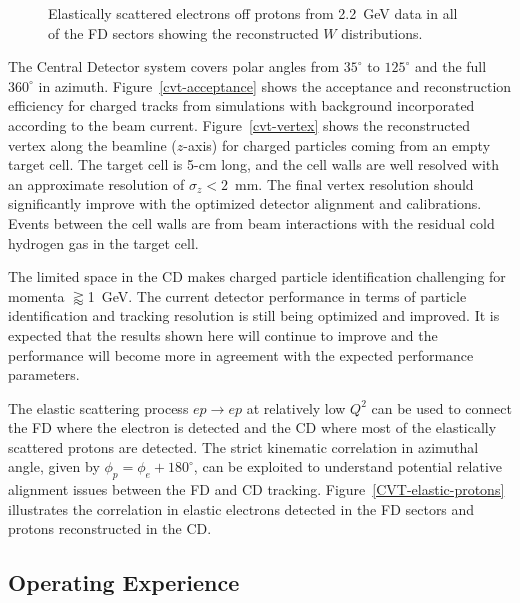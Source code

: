 \documentclass[final,3p,twocolumn]{elsarticle}
\begin{document}
\begin{figure}[t!]
\caption{Elastically scattered electrons off protons from 2.2~GeV data in all of the FD sectors showing the
  reconstructed $W$ distributions.}
\label{elastic-electrons}
\end{figure}

The Central Detector system covers polar angles from $35^\circ$ to $125^\circ$ and the full $360^\circ$ in azimuth.
Figure~\ref{cvt-acceptance} shows the acceptance and reconstruction efficiency for charged tracks from simulations
with background incorporated according to the beam current. Figure~\ref{cvt-vertex}  shows the reconstructed
vertex along the beamline ($z$-axis) for charged particles coming from an empty target cell. The target cell is 5-cm
long, and the cell walls are well resolved with an approximate resolution of $\sigma_z<2$~mm. The final vertex
resolution should significantly improve with the optimized detector alignment and calibrations. Events between the cell
walls are from beam interactions with the residual cold hydrogen gas in the target cell.  

The limited space in the CD makes charged particle identification challenging for momenta $\gtrapprox$1~GeV.
The current detector performance in terms of particle identification and tracking resolution is still being optimized
and improved. It is expected that the results shown here will continue to improve and the performance will become
more in agreement with the expected performance parameters.

The elastic scattering process $ep \to ep$ at relatively low $Q^2$ can be used to connect the FD where the electron
is detected and the CD where most of the elastically scattered protons are detected. The strict kinematic correlation
in azimuthal angle, given by  $\phi_p = \phi_e + 180^\circ$,  can be exploited to understand potential relative alignment
issues between the FD and CD tracking. Figure~\ref{CVT-elastic-protons} illustrates the correlation in elastic
electrons detected in the FD sectors and protons reconstructed in the CD. 

\subsection{Operating Experience}
\end{document}
